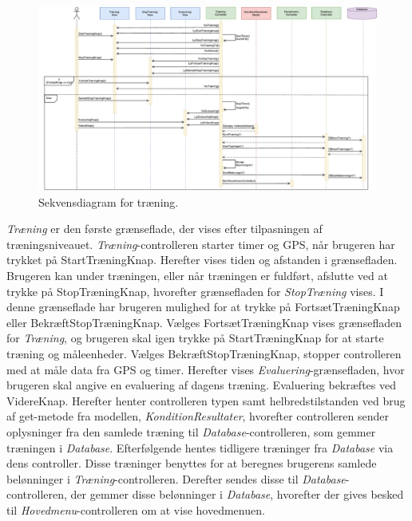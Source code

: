 \begin{figure} [H]
\centering
\includegraphics[width=1.55\textwidth, angle=90]{figures/Sek/SEKTraening}
\caption{Sekvensdiagram for træning.}
\label{fig:SEKTraening}
\end{figure}

\noindent
\textit{Træning} er den første grænseflade, der vises efter tilpasningen af træningsniveauet. \textit{Træning}-controlleren starter timer og GPS, når brugeren har trykket på StartTræningKnap. Herefter vises tiden og afstanden i grænsefladen. Brugeren kan under træningen, eller når træningen er fuldført, afslutte ved at trykke på StopTræningKnap, hvorefter grænsefladen for \textit{StopTræning} vises. I denne grænseflade har brugeren mulighed for at trykke på FortsætTræningKnap eller BekræftStopTræningKnap. Vælges FortsætTræningKnap vises grænsefladen for \textit{Træning}, og brugeren skal igen trykke på StartTræningKnap for at starte træning og måleenheder. Vælges BekræftStopTræningKnap, stopper controlleren med at måle data fra GPS og timer. Herefter vises \textit{Evaluering}-grænsefladen, hvor brugeren skal angive en evaluering af dagens træning. Evaluering bekræftes ved VidereKnap. Herefter henter controlleren typen samt helbredstilstanden ved brug af get-metode fra modellen, \textit{KonditionResultater}, hvorefter controlleren sender oplysninger fra den samlede træning til \textit{Database}-controlleren, som gemmer træningen i \textit{Database}. Efterfølgende hentes tidligere træninger fra \textit{Database} via dens controller. Disse træninger benyttes for at beregnes brugerens samlede belønninger i \textit{Træning}-controlleren. Derefter sendes disse til \textit{Database}-controlleren, der gemmer disse belønninger i \textit{Database}, hvorefter der gives besked til \textit{Hovedmenu}-controlleren om at vise hovedmenuen.




